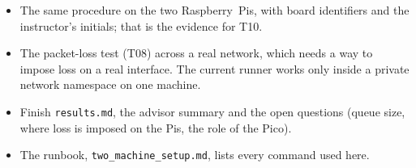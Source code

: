 \documentclass[11pt,a4paper]{article}
\begin{document}
\begin{itemize}\setlength\itemsep{0.1em}
\item The same procedure on the two Raspberry~Pis, with board identifiers and the instructor's
  initials; that is the evidence for T10.
\item The packet-loss test (T08) across a real network, which needs a way to impose loss on a real
  interface. The current runner works only inside a private network namespace on one machine.
\item Finish \texttt{results.md}, the advisor summary and the open questions (queue size, where
  loss is imposed on the Pis, the role of the Pico).
\item The runbook, \texttt{two\_machine\_setup.md}, lists every command used here.
\end{itemize}
\end{document}
